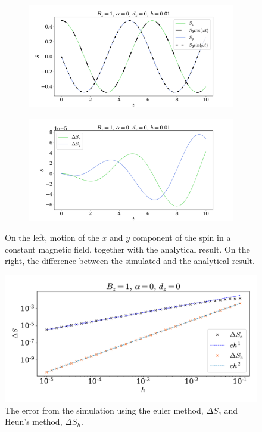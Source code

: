 \documentclass{article}
\begin{document}
    \begin{figure}[H]
        \begin{subfigure}{.49\textwidth}
            \includegraphics[width=1.1\textwidth]{../plots/single.pdf}            
        \end{subfigure}
        \begin{subfigure}{.49\textwidth}
            \includegraphics[width=1.1\textwidth]{../plots/single_diff.pdf}            
        \end{subfigure}
        \caption{On the left, motion of the $x$ and $y$ component of the spin in a constant magnetic field, together with the analytical result. On the right, the difference between the simulated and the analytical result.}
        \label{single spin}
    \end{figure}

    \begin{figure}[H]
        \centering
        \includegraphics[width=.7\textwidth]{../plots/err.pdf}
        \caption{The error from the simulation using the euler method, $\Delta S_e$ and Heun's method, $\Delta S_h$.}
        \label{error}
    \end{figure}
\end{document}
